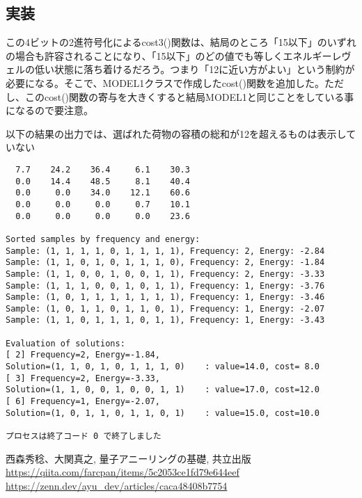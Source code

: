 \documentclass[uplatex,dvipdfmx,a4paper,11pt,oneside,openany]{jsbook}
\begin{document}
\subsection{実装}



この4ビットの2進符号化によるcost3()関数は、結局のところ「15以下」のいずれの場合も許容されることになり、「15以下」のどの値でも等しくエネルギーレヴェルの低い状態に落ち着けるだろう。つまり「12に近い方がよい」という制約が必要になる。そこで、MODEL1クラスで作成したcost()関数を追加した。ただし、このcost()関数の寄与を大きくすると結局MODEL1と同じことをしている事になるので要注意。

以下の結果の出力では、選ばれた荷物の容積の総和が12を超えるものは表示していない

\begin{verbatim}
  7.7    24.2    36.4     6.1    30.3
  0.0    14.4    48.5     8.1    40.4
  0.0     0.0    34.0    12.1    60.6
  0.0     0.0     0.0     0.7    10.1
  0.0     0.0     0.0     0.0    23.6

Sorted samples by frequency and energy:
Sample: (1, 1, 1, 1, 0, 1, 1, 1, 1), Frequency: 2, Energy: -2.84
Sample: (1, 1, 0, 1, 0, 1, 1, 1, 0), Frequency: 2, Energy: -1.84
Sample: (1, 1, 0, 0, 1, 0, 0, 1, 1), Frequency: 2, Energy: -3.33
Sample: (1, 1, 1, 0, 0, 1, 0, 1, 1), Frequency: 1, Energy: -3.76
Sample: (1, 0, 1, 1, 1, 1, 1, 1, 1), Frequency: 1, Energy: -3.46
Sample: (1, 0, 1, 1, 0, 1, 1, 0, 1), Frequency: 1, Energy: -2.07
Sample: (1, 1, 0, 1, 1, 1, 0, 1, 1), Frequency: 1, Energy: -3.43

Evaluation of solutions:
[ 2] Frequency=2, Energy=-1.84,
Solution=(1, 1, 0, 1, 0, 1, 1, 1, 0)	: value=14.0, cost= 8.0
[ 3] Frequency=2, Energy=-3.33,
Solution=(1, 1, 0, 0, 1, 0, 0, 1, 1)	: value=17.0, cost=12.0
[ 6] Frequency=1, Energy=-2.07,
Solution=(1, 0, 1, 1, 0, 1, 1, 0, 1)	: value=15.0, cost=10.0

プロセスは終了コード 0 で終了しました
\end{verbatim}


\begin{thebibliography}{9}
   西森秀稔、大関真之, 量子アニーリングの基礎, 共立出版
   \url{https://qiita.com/farcpan/items/5c2053ce1fd79e644eef}
   \url{https://zenn.dev/ayu_dev/articles/caca48408b7754}
\end{thebibliography}
\end{document}
